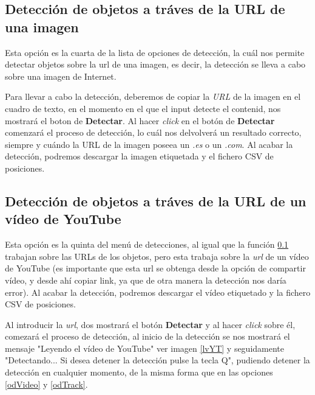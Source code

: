 \subsection{Detección de objetos a tráves de la URL de una imagen} \label{odURl}
Esta opción es la cuarta de la lista de opciones de detección, la cuál nos permite detectar objetos sobre la url de una imagen, es decir, la detección se lleva a cabo sobre una imagen de Internet.


Para llevar a cabo la detección, deberemos de copiar la \textit{URL} de la imagen en el cuadro de texto, en el momento en el que el input detecte el contenid, nos mostrará el boton de \textbf{Detectar}.
Al hacer \textit{click} en el botón de \textbf{Detectar} comenzará el proceso de detección, lo cuál nos delvolverá un resultado correcto, siempre y cuándo la URL de la imagen poseea un \textit{.es} o un \textit{.com}.
Al acabar la detección, podremos descargar la imagen etiquetada y el fichero CSV de posiciones.


\subsection{Detección de objetos a tráves de la URL de un vídeo de YouTube}
Esta opción es la quinta del menú de detecciones, al igual que la función \ref{odURl} trabajan sobre las URLs de los objetos, pero esta trabaja sobre la \textit{url} de un vídeo de YouTube (es importante que esta url se obtenga desde la opción de compartir vídeo, y desde ahí copiar link, ya que de otra manera la detección nos daría error).
Al acabar la detección, podremos descargar el vídeo etiquetado y la fichero CSV de posiciones.


Al introducir la \textit{url}, dos mostrará el botón \textbf{Detectar} y al hacer \textit{click} sobre él, comezará el proceso de detección, al inicio de la detección
se nos mostrará el mensaje "Leyendo el vídeo de YouTube" ver imagen \ref{lvYT} y seguidamente "Detectando... Si desea detener la detección pulse la tecla Q", pudiendo detener la detección en cualquier momento, de la misma forma que en las opciones \ref{odVideo} y \ref{odTrack}.


